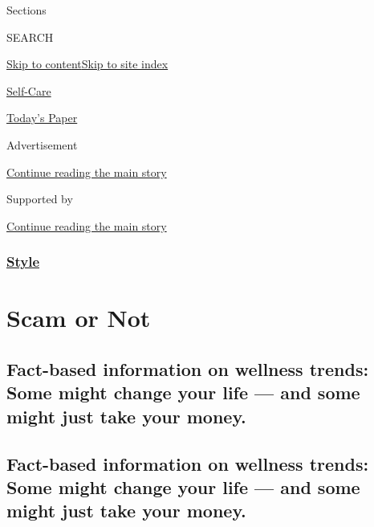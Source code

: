 Sections

SEARCH

\protect\hyperlink{site-content}{Skip to
content}\protect\hyperlink{site-index}{Skip to site index}

\href{https://www.nytimes3xbfgragh.onion/section/style/self-care/}{Self-Care}

\href{https://myaccount.nytimes3xbfgragh.onion/auth/login?response_type=cookie\&client_id=vi}{}

\href{https://www.nytimes3xbfgragh.onion/section/todayspaper}{Today's
Paper}

Advertisement

\protect\hyperlink{after-top}{Continue reading the main story}

Supported by

\protect\hyperlink{after-sponsor}{Continue reading the main story}

\hypertarget{style}{%
\subsubsection{\texorpdfstring{\href{/section/style}{Style}}{Style}}\label{style}}

\hypertarget{scam-or-not}{%
\section{Scam or Not}\label{scam-or-not}}

\hypertarget{fact-based-information-on-wellness-trends-some-might-change-your-life--and-some-might-just-take-your-money}{%
\subsection{Fact-based information on wellness trends: Some might change
your life --- and some might just take your
money.}\label{fact-based-information-on-wellness-trends-some-might-change-your-life--and-some-might-just-take-your-money}}

\hypertarget{fact-based-information-on-wellness-trends-some-might-change-your-life--and-some-might-just-take-your-money-1}{%
\subsection{Fact-based information on wellness trends: Some might change
your life --- and some might just take your
money.}\label{fact-based-information-on-wellness-trends-some-might-change-your-life--and-some-might-just-take-your-money-1}}


